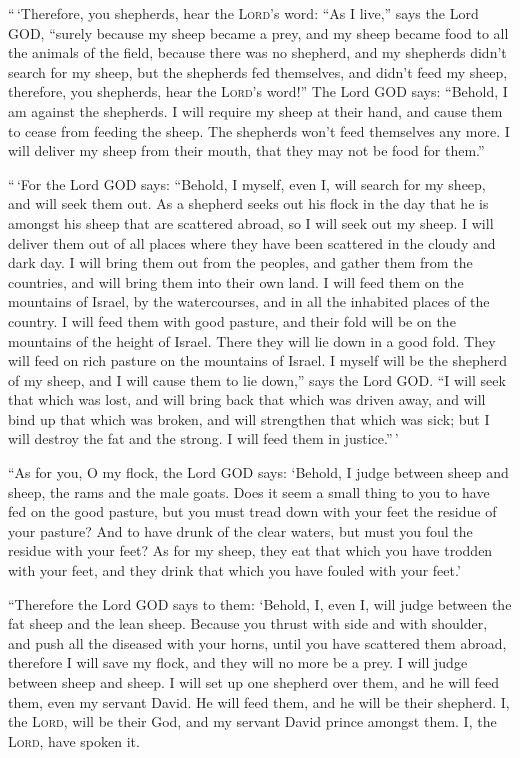  ``\,`Therefore, you shepherds, hear the \textsc{Lord}'s
word:  ``As I live,'' says the Lord GOD, ``surely because
my sheep became a prey, and my sheep became food to all the animals of
the field, because there was no shepherd, and my shepherds didn't search
for my sheep, but the shepherds fed themselves, and didn't feed my
sheep,  therefore, you shepherds, hear the \textsc{Lord}'s
word!''  The Lord GOD says: ``Behold, I am against the
shepherds. I will require my sheep at their hand, and cause them to
cease from feeding the sheep. The shepherds won't feed themselves any
more. I will deliver my sheep from their mouth, that they may not be
food for them.''

 ``\,`For the Lord GOD says: ``Behold, I myself, even I,
will search for my sheep, and will seek them out.  As a
shepherd seeks out his flock in the day that he is amongst his sheep
that are scattered abroad, so I will seek out my sheep. I will deliver
them out of all places where they have been scattered in the cloudy and
dark day.  I will bring them out from the peoples, and
gather them from the countries, and will bring them into their own land.
I will feed them on the mountains of Israel, by the watercourses, and in
all the inhabited places of the country.  I will feed
them with good pasture, and their fold will be on the mountains of the
height of Israel. There they will lie down in a good fold. They will
feed on rich pasture on the mountains of Israel.  I
myself will be the shepherd of my sheep, and I will cause them to lie
down,'' says the Lord GOD.  ``I will seek that which was
lost, and will bring back that which was driven away, and will bind up
that which was broken, and will strengthen that which was sick; but I
will destroy the fat and the strong. I will feed them in justice.''\,'

 ``As for you, O my flock, the Lord GOD says: `Behold, I
judge between sheep and sheep, the rams and the male goats.
 Does it seem a small thing to you to have fed on the
good pasture, but you must tread down with your feet the residue of your
pasture? And to have drunk of the clear waters, but must you foul the
residue with your feet?  As for my sheep, they eat that
which you have trodden with your feet, and they drink that which you
have fouled with your feet.'

 ``Therefore the Lord GOD says to them: `Behold, I, even
I, will judge between the fat sheep and the lean sheep. 
Because you thrust with side and with shoulder, and push all the
diseased with your horns, until you have scattered them abroad,
 therefore I will save my flock, and they will no more be
a prey. I will judge between sheep and sheep.  I will set
up one shepherd over them, and he will feed them, even my servant David.
He will feed them, and he will be their shepherd.  I, the
\textsc{Lord}, will be their God, and my servant David prince amongst
them. I, the \textsc{Lord}, have spoken it.

